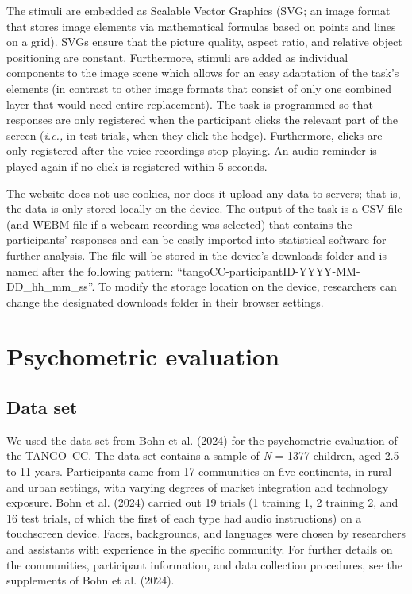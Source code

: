 \documentclass[
  man,floatsintext]{apa7}
\begin{document}
The stimuli are embedded as Scalable Vector Graphics (SVG; an image format that stores image elements via mathematical formulas based on points and lines on a grid).
SVGs ensure that the picture quality, aspect ratio, and relative object positioning are constant.
Furthermore, stimuli are added as individual components to the image scene which allows for an easy adaptation of the task's elements (in contrast to other image formats that consist of only one combined layer that would need entire replacement).
The task is programmed so that responses are only registered when the participant clicks the relevant part of the screen (\emph{i.e.,} in test trials, when they click the hedge).
Furthermore, clicks are only registered after the voice recordings stop playing.
An audio reminder is played again if no click is registered within 5 seconds.

The website does not use cookies, nor does it upload any data to servers; that is, the data is only stored locally on the device.
The output of the task is a CSV file (and WEBM file if a webcam recording was selected) that contains the participants' responses and can be easily imported into statistical software for further analysis.
The file will be stored in the device's downloads folder and is named after the following pattern: ``tangoCC-participantID-YYYY-MM-DD\_hh\_mm\_ss''. To modify the storage location on the device, researchers can change the designated downloads folder in their browser settings.

\section{Psychometric evaluation}\label{psychometric-evaluation}

\subsection{Data set}\label{data-set}

We used the data set from Bohn et al. (2024) for the psychometric evaluation of the TANGO--CC.
The data set contains a sample of \emph{N} = 1377 children, aged 2.5 to 11 years.
Participants came from 17 communities on five continents, in rural and urban settings, with varying degrees of market integration and technology exposure.
Bohn et al. (2024) carried out 19 trials (1 training 1, 2 training 2, and 16 test trials, of which the first of each type had audio instructions) on a touchscreen device.
Faces, backgrounds, and languages were chosen by researchers and assistants with experience in the specific community.
For further details on the communities, participant information, and data collection procedures, see the supplements of Bohn et al. (2024).
\end{document}
